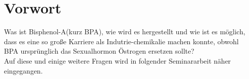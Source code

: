 \section{Vorwort}
Was ist Bisphenol-A(kurz BPA), wie wird es hergestellt und wie ist es möglich, dass es eine 
so große Karriere als Indutrie-chemikalie machen konnte, obwohl BPA ursprünglich
das Sexualhormon \glqq Östrogen\grqq{} ersetzen sollte?\\
Auf diese und einige weitere Fragen wird in folgender Seminararbeit näher eingegangen. 
